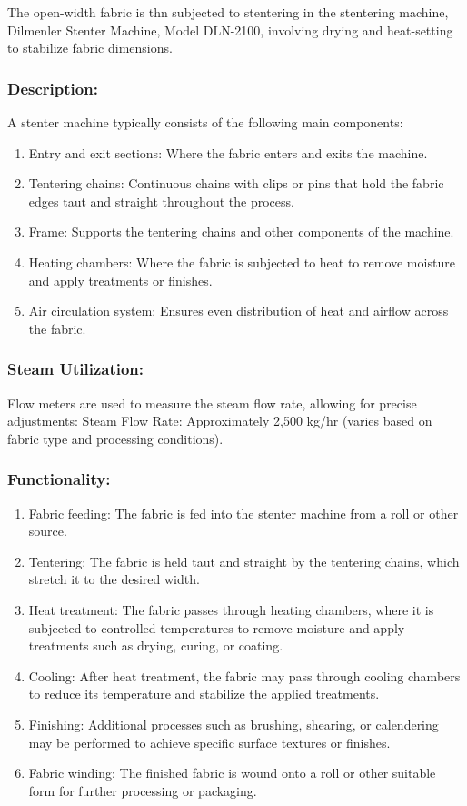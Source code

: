 The open-width fabric is thn subjected to stentering in the stentering machine, Dilmenler Stenter Machine, Model DLN-2100, 
involving drying and heat-setting to stabilize fabric dimensions.


\subsubsection{Description:}


A stenter machine typically consists of the following main components:


\begin{enumerate}
\item
  Entry and exit sections: Where the fabric enters and exits the
  machine.
\item
  Tentering chains: Continuous chains with clips or pins that hold the
  fabric edges taut and straight throughout the process.
\item
  Frame: Supports the tentering chains and other components of the
  machine.
\item
  Heating chambers: Where the fabric is subjected to heat to remove
  moisture and apply treatments or finishes.
\item
  Air circulation system: Ensures even distribution of heat and airflow
  across the fabric.
\end{enumerate}

\subsubsection{Steam Utilization:}
Flow meters are used to measure the steam flow rate, allowing for precise adjustments:
Steam Flow Rate: Approximately 2,500 kg/hr (varies based on fabric type and processing conditions).


\subsubsection{Functionality:}

\begin{enumerate}
\item
  Fabric feeding: The fabric is fed into the stenter machine from a roll
  or other source.
\item
  Tentering: The fabric is held taut and straight by the tentering
  chains, which stretch it to the desired width.
\item
  Heat treatment: The fabric passes through heating chambers, where it
  is subjected to controlled temperatures to remove moisture and apply
  treatments such as drying, curing, or coating.
\item
  Cooling: After heat treatment, the fabric may pass through cooling
  chambers to reduce its temperature and stabilize the applied
  treatments.
\item
  Finishing: Additional processes such as brushing, shearing, or
  calendering may be performed to achieve specific surface textures or
  finishes.
\item
  Fabric winding: The finished fabric is wound onto a roll or other
  suitable form for further processing or packaging.
\end{enumerate}




